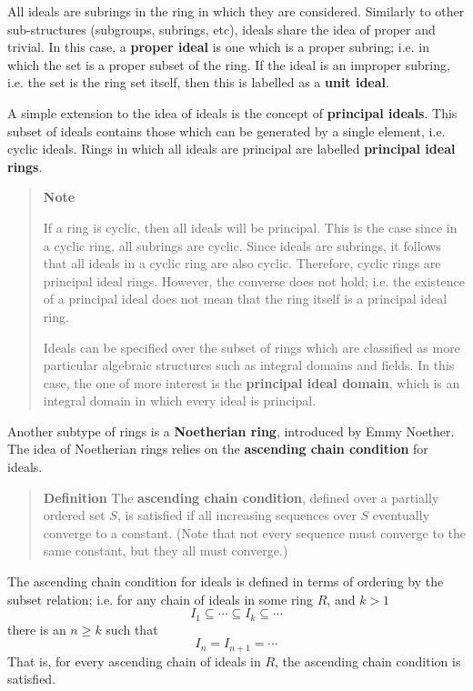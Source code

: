\documentclass[letterpaper,12pt,titlepage,oneside,final]{book}
\newenvironment{example}{\begin{quote}%
  \textbf{Example }%
  \quad
}{%
\end{quote}%
}
\newenvironment{defn}{\begin{quote}%
  \textbf{Definition }%
  \quad
}{%
\end{quote}%
}
\newenvironment{note}{\begin{quote}%
  \textbf{Note }%
  \quad
}{%
\end{quote}%
}
\begin{document}
All ideals are subrings in the ring in which they are considered.  Similarly to other sub-structures (subgroups, subrings, etc), ideals share the idea of proper and trivial.  In this case, a \textbf{proper ideal} is one which is a proper subring; i.e. in which the set is a proper subset of the ring.  If the ideal is an improper subring, i.e. the set is the ring set itself, then this is labelled as a \textbf{unit ideal}.  

A simple extension to the idea of ideals is the concept of \textbf{principal ideals}.  This subset of ideals contains those which can be generated by a single element, i.e. cyclic ideals.  Rings in which all ideals are principal are labelled \textbf{principal ideal rings}.  

\begin{note}
  If a ring is cyclic, then all ideals will be principal.  This is the case since in a cyclic ring, all subrings are cyclic.  Since ideals are subrings, it follows that all ideals in a cyclic ring are also cyclic.  Therefore, cyclic rings are principal ideal rings.  However, the converse does not hold; i.e. the existence of a principal ideal does not mean that the ring itself is a principal ideal ring.  

  Ideals can be specified over the subset of rings which are classified as more particular algebraic structures such as integral domains and fields.  In this case, the one of more interest is the \textbf{principal ideal domain}, which is an integral domain in which every ideal is principal.  
\end{note}

  

Another subtype of rings is a \textbf{Noetherian ring}, introduced by Emmy Noether.  The idea of Noetherian rings relies on the \textbf{ascending chain condition} for ideals.

\begin{defn}\label{Ascending Chain Condition}
  The \textbf{ascending chain condition}, defined over a partially ordered set ${S}$, is satisfied if all increasing sequences over ${S}$ eventually converge to a constant.  (Note that not every sequence must converge to the same constant, but they all must converge.)
\end{defn}

The ascending chain condition for ideals is defined in terms of ordering by the subset relation; i.e. for any chain of ideals in some ring ${R}$, and ${k > 1}$
\begin{equation*}
  I_1 \subseteq \cdots \subseteq I_k \subseteq \cdots
\end{equation*}
there is an ${n \geq k}$ such that 
\begin{equation*}
  I_n = I_{n+1} = \cdots
\end{equation*}
That is, for every ascending chain of ideals in ${R}$, the ascending chain condition is satisfied.
\end{document}
